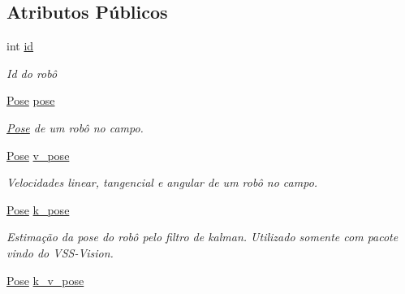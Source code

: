 \subsection*{Atributos Públicos}
\begin{DoxyCompactItemize}
\item 
int \hyperlink{structcommon_1_1Robot_a59c0c9960153de3d38d4bbcc479015e3}{id}\hypertarget{structcommon_1_1Robot_a59c0c9960153de3d38d4bbcc479015e3}{}\label{structcommon_1_1Robot_a59c0c9960153de3d38d4bbcc479015e3}

\begin{DoxyCompactList}\small\item\em Id do robô \end{DoxyCompactList}\item 
\hyperlink{structcommon_1_1Pose}{Pose} \hyperlink{structcommon_1_1Robot_a9b7add6f5e5486d5d9bab91ab1800225}{pose}\hypertarget{structcommon_1_1Robot_a9b7add6f5e5486d5d9bab91ab1800225}{}\label{structcommon_1_1Robot_a9b7add6f5e5486d5d9bab91ab1800225}

\begin{DoxyCompactList}\small\item\em \hyperlink{structcommon_1_1Pose}{Pose} de um robô no campo. \end{DoxyCompactList}\item 
\hyperlink{structcommon_1_1Pose}{Pose} \hyperlink{structcommon_1_1Robot_a76821833979c7bca183906c74d383d7d}{v\+\_\+pose}\hypertarget{structcommon_1_1Robot_a76821833979c7bca183906c74d383d7d}{}\label{structcommon_1_1Robot_a76821833979c7bca183906c74d383d7d}

\begin{DoxyCompactList}\small\item\em Velocidades linear, tangencial e angular de um robô no campo. \end{DoxyCompactList}\item 
\hyperlink{structcommon_1_1Pose}{Pose} \hyperlink{structcommon_1_1Robot_a33dcdc52395edee9f7e27fa609eedeb2}{k\+\_\+pose}\hypertarget{structcommon_1_1Robot_a33dcdc52395edee9f7e27fa609eedeb2}{}\label{structcommon_1_1Robot_a33dcdc52395edee9f7e27fa609eedeb2}

\begin{DoxyCompactList}\small\item\em Estimação da pose do robô pelo filtro de kalman. Utilizado somente com pacote vindo do V\+S\+S-\/\+Vision. \end{DoxyCompactList}\item 
\hyperlink{structcommon_1_1Pose}{Pose} \hyperlink{structcommon_1_1Robot_a1f76a8c236dbaa91e16f1d02c0340be9}{k\+\_\+v\+\_\+pose}\hypertarget{structcommon_1_1Robot_a1f76a8c236dbaa91e16f1d02c0340be9}{}\label{structcommon_1_1Robot_a1f76a8c236dbaa91e16f1d02c0340be9}


\end{DoxyCompactItemize}
